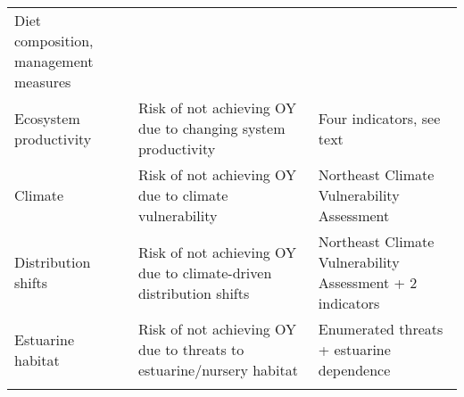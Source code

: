 \documentclass[11pt,]{article}
\begin{document}
\begin{longtable}[]{@{}lll@{}}
\begin{minipage}[t]{0.33\columnwidth}
Diet composition, management measures\strut
\end{minipage}\tabularnewline
\begin{minipage}[t]{0.25\columnwidth}\raggedright\strut
Ecosystem productivity\strut
\end{minipage} & \begin{minipage}[t]{0.33\columnwidth}\raggedright\strut
Risk of not achieving OY due to changing system productivity\strut
\end{minipage} & \begin{minipage}[t]{0.33\columnwidth}\raggedright\strut
Four indicators, see text\strut
\end{minipage}\tabularnewline
\begin{minipage}[t]{0.25\columnwidth}\raggedright\strut
Climate\strut
\end{minipage} & \begin{minipage}[t]{0.33\columnwidth}\raggedright\strut
Risk of not achieving OY due to climate vulnerability\strut
\end{minipage} & \begin{minipage}[t]{0.33\columnwidth}\raggedright\strut
Northeast Climate Vulnerability Assessment\strut
\end{minipage}\tabularnewline
\begin{minipage}[t]{0.25\columnwidth}\raggedright\strut
Distribution shifts\strut
\end{minipage} & \begin{minipage}[t]{0.33\columnwidth}\raggedright\strut
Risk of not achieving OY due to climate-driven distribution shifts\strut
\end{minipage} & \begin{minipage}[t]{0.33\columnwidth}\raggedright\strut
Northeast Climate Vulnerability Assessment + 2 indicators\strut
\end{minipage}\tabularnewline
\begin{minipage}[t]{0.25\columnwidth}\raggedright\strut
Estuarine habitat\strut
\end{minipage} & \begin{minipage}[t]{0.33\columnwidth}\raggedright\strut
Risk of not achieving OY due to threats to estuarine/nursery
habitat\strut
\end{minipage} & \begin{minipage}[t]{0.33\columnwidth}\raggedright\strut
Enumerated threats + estuarine dependence\strut
\end{minipage}\tabularnewline
\begin{minipage}[t]{0.25\columnwidth}\raggedright\strut

\end{minipage}
\end{longtable}
\end{document}
